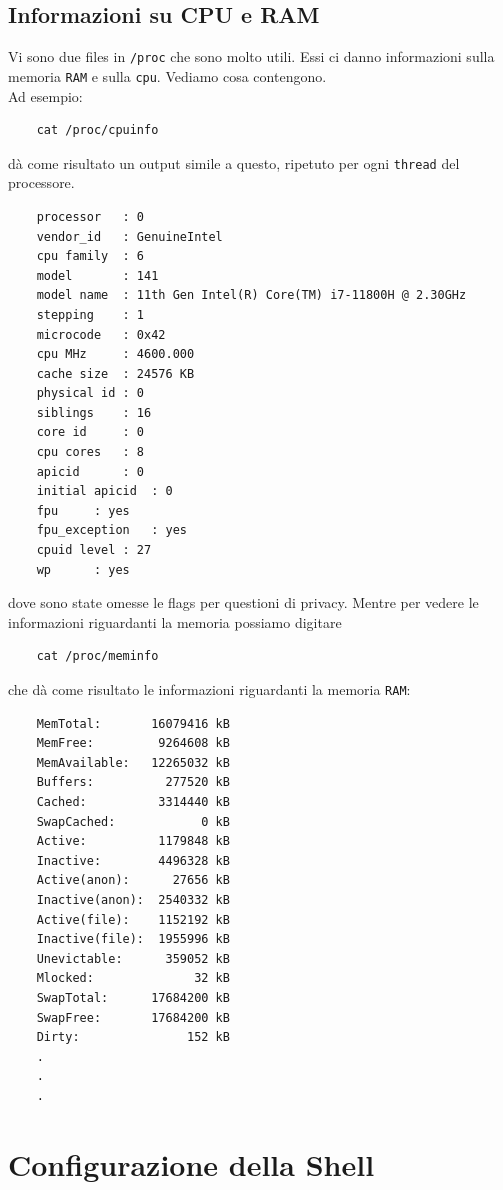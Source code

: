 \documentclass[11pt]{book}
\begin{document}
\subsection{Informazioni su CPU e RAM}
Vi sono due files in \verb*|/proc| che sono molto utili. Essi ci danno informazioni sulla memoria \verb*|RAM| e sulla \verb*|cpu|. Vediamo cosa contengono.\\
 Ad esempio:
\begin{verbatim}
	cat /proc/cpuinfo
\end{verbatim}
dà come risultato un output simile a questo, ripetuto per ogni \verb*|thread| del processore. 
\begin{verbatim}
	processor	: 0
	vendor_id	: GenuineIntel
	cpu family	: 6
	model		: 141
	model name	: 11th Gen Intel(R) Core(TM) i7-11800H @ 2.30GHz
	stepping	: 1
	microcode	: 0x42
	cpu MHz		: 4600.000
	cache size	: 24576 KB
	physical id	: 0
	siblings	: 16
	core id		: 0
	cpu cores	: 8
	apicid		: 0
	initial apicid	: 0
	fpu		: yes
	fpu_exception	: yes
	cpuid level	: 27
	wp		: yes
\end{verbatim}
dove sono state omesse le flags per questioni di privacy. Mentre per vedere le informazioni riguardanti la memoria possiamo digitare
\begin{verbatim}
	cat /proc/meminfo
\end{verbatim}
che dà come risultato le informazioni riguardanti la memoria \verb*|RAM|:
\begin{verbatim}
	MemTotal:       16079416 kB
	MemFree:         9264608 kB
	MemAvailable:   12265032 kB
	Buffers:          277520 kB
	Cached:          3314440 kB
	SwapCached:            0 kB
	Active:          1179848 kB
	Inactive:        4496328 kB
	Active(anon):      27656 kB
	Inactive(anon):  2540332 kB
	Active(file):    1152192 kB
	Inactive(file):  1955996 kB
	Unevictable:      359052 kB
	Mlocked:              32 kB
	SwapTotal:      17684200 kB
	SwapFree:       17684200 kB
	Dirty:               152 kB
	.
	.
	.
\end{verbatim}

\section{Configurazione della Shell}
\end{document}

